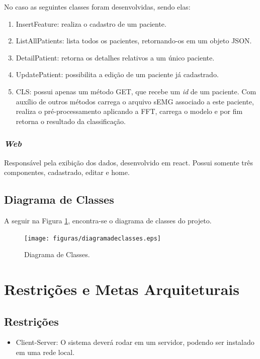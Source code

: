 \begin{apendicesenv}
    No caso as seguintes classes foram desenvolvidas, sendo elas:
    \begin{enumerate}
        \item InsertFeature: realiza o cadastro de um paciente.
        \item ListAllPatients: lista todos os pacientes, retornando-os em um objeto JSON.
        \item DetailPatient: retorna os detalhes relativos a um único paciente.
        \item UpdatePatient: possibilita a edição de um paciente já cadastrado.
        \item CLS: possui apenas um método GET, que recebe um \textit{id} de um paciente. Com auxílio de outros métodos carrega o arquivo sEMG associado a este paciente, realiza o pré-processamento aplicando a FFT, carrega o modelo e por fim retorna o resultado da classificação.
    \end{enumerate}

    \subsubsection{\textit{Web}}
    Responsável pela exibição dos dados, desenvolvido em react. Possui somente três componentes, cadastrado, editar e home.

   \subsection{Diagrama de Classes}
   A seguir na Figura \ref{diagramadeclasses}, encontra-se o diagrama de classes do projeto.
   \begin{figure}[!htb]
        \centering
        \texttt{[image: figuras/diagramadeclasses.eps]}
        \caption{Diagrama de Classes.}
        \label{diagramadeclasses}
   \end{figure}
  
    \section{Restrições e Metas Arquiteturais}
    \subsection{Restrições}
    \begin{itemize}
        \item Client-Server: O sistema deverá rodar em um servidor, podendo ser instalado em uma rede local.
    \end{itemize}
  


\end{apendicesenv}
